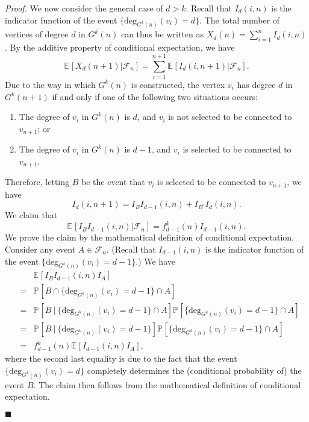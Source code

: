 \documentclass[11pt]{article}
\providecommand{\expectation}[2]{\mathbb{E}_{#2}\left[#1\right]}
\providecommand{\probab}[2]{\mathbb{P}_{#2}\left[#1\right]}
\newenvironment{proof}[0]{\textit{Proof.} }{\hfill  $\blacksquare$ }
\providecommand{\degree}[2]{{\textrm{deg}_{#1}(#2)}}
\providecommand{\vcprob}[3]{f^{#1}_{#2}(#3)}
\providecommand{\rktree}[2]{G^{#1}(#2)}
\providecommand{\tdeg}[2]{X_{#1}(#2)}
\begin{document}
\begin{proof}
We now consider the general case of $d > k$. 
Recall that $I_d(i, n)$ is the indicator function of the event
$\{\degree{G^{k}(n)}{v_i} = d\}$.  The total number of 
vertices of degree $d$ in $G^{k}(n)$ can thus be written as
$\tdeg{d}{n} = \sum\limits_{i = 1}^{n}I_{d}(i, n)$. 
By the additive property of conditional expectation, we have
\begin{equation}
\label{eq-cond-total}
\expectation{\tdeg{d}{n + 1} | \mathcal{F}_n}{} = \sum\limits_{i = 1}^{n + 1} \expectation{I_d(i, n + 1) | \mathcal{F}_n}{}.
\end{equation}
Due to the way in which $\rktree{k}{n}$ is constructed,  the vertex $v_i$ has degree $d$ in 
$\rktree{k}{n + 1}$ if and only if one of the following two situations occurs:
\begin{enumerate}
\item The degree of $v_i$ in $\rktree{k}{n}$ is $d$, and $v_i$  is not selected to be connected
to $v_{n+1}$; or
\item The degree of $v_i$ in $\rktree{k}{n}$ is $d - 1$, and $v_i$ is selected to be connected
to $v_{n+1}$.   
\end{enumerate}
Therefore,  letting $B$ be the event that $v_i$ is selected to be connected to $v_{n + 1}$, we have
\begin{equation} 
\label{eq:conde-indicator}
I_{d}(i, n + 1) = I_{B}I_{d - 1}(i, n) + I_{B^c}I_{d}(i, n).
\end{equation}
We claim that 
\begin{equation}
\label{eq:conde-g1}
\expectation{I_{B}I_{d - 1}(i, n) | \mathcal{F}_n}{}
 = \vcprob{k}{d-1}{n} I_{d-1}(i, n).
\end{equation}
We prove the claim by the mathematical definition of conditional expectation.
Consider any event $A \in \mathcal{F}_n$.  
(Recall that $I_{d - 1}(i, n)$ is the indicator function of the event
$\{\degree{\rktree{k}{n}}{v_i} = d - 1\}$.) We have 
\begin{eqnarray*}
&&\expectation{I_{B}I_{d - 1}(i, n)I_{A}}{} \\
    &=& \probab{B \cap \{\degree{\rktree{k}{n}}{v_i} = d - 1\} \cap A}{}  \\
    &=& \probab{B\ |\ \{\degree{\rktree{k}{n}}{v_i} = d - 1\} \cap A }{}
         \probab{\{\degree{\rktree{k}{n}}{v_i} = d - 1\}\cap A}{} \\
    &=& \probab{B\ |\ \{\degree{\rktree{k}{n}}{v_i} = d - 1\}}{}
        \probab{\{\degree{\rktree{k}{n}}{v_i} = d - 1\} \cap A}{} \\
    &=& \vcprob{k}{d-1}{n} \expectation{I_{d - 1}(i, n) I_{A}}{},           
\end{eqnarray*}
where the second last equality is due to the fact that the event 
$\{\degree{\rktree{k}{n}}{v_i} = d\}$ completely determines 
the (conditional probability of) the event $B$.
The claim then follows from the mathematical definition of conditional expectation.


\end{proof}
\end{document}
